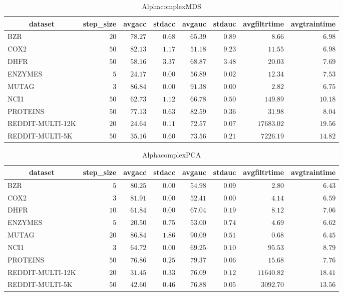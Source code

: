 \begin{table}[!tbp]
\caption{AlphacomplexMDS\label{AlphacomplexMDS}} 
{\centering
\begin{tabular}{lrrrrrrr}
\hline\hline
\multicolumn{1}{c}{dataset}&\multicolumn{1}{c}{step_size}&\multicolumn{1}{c}{avgacc}&\multicolumn{1}{c}{stdacc}&\multicolumn{1}{c}{avgauc}&\multicolumn{1}{c}{stdauc}&\multicolumn{1}{c}{avgfiltrtime}&\multicolumn{1}{c}{avgtraintime}\tabularnewline
\hline
BZR&$20$&$78.27$&$0.68$&$65.39$&$0.89$&$    8.66$&$ 6.98$\tabularnewline
COX2&$50$&$82.13$&$1.17$&$51.18$&$9.23$&$   11.55$&$ 6.98$\tabularnewline
DHFR&$50$&$58.16$&$3.37$&$68.87$&$3.48$&$   20.03$&$ 7.69$\tabularnewline
ENZYMES&$ 5$&$24.17$&$0.00$&$56.89$&$0.02$&$   12.34$&$ 7.53$\tabularnewline
MUTAG&$ 3$&$86.84$&$0.00$&$91.38$&$0.00$&$    2.82$&$ 6.75$\tabularnewline
NCI1&$50$&$62.73$&$1.12$&$66.78$&$0.50$&$  149.89$&$10.18$\tabularnewline
PROTEINS&$50$&$77.13$&$0.63$&$82.59$&$0.36$&$   31.98$&$ 8.04$\tabularnewline
REDDIT-MULTI-12K&$20$&$24.64$&$0.11$&$72.57$&$0.07$&$17683.02$&$19.56$\tabularnewline
REDDIT-MULTI-5K&$50$&$35.16$&$0.60$&$73.56$&$0.21$&$ 7226.19$&$14.82$\tabularnewline
\hline
\end{tabular}}
\end{table}
\begin{table}[!tbp]
\caption{AlphacomplexPCA\label{AlphacomplexPCA}} 
{\centering
\begin{tabular}{lrrrrrrr}
\hline\hline
\multicolumn{1}{c}{dataset}&\multicolumn{1}{c}{step_size}&\multicolumn{1}{c}{avgacc}&\multicolumn{1}{c}{stdacc}&\multicolumn{1}{c}{avgauc}&\multicolumn{1}{c}{stdauc}&\multicolumn{1}{c}{avgfiltrtime}&\multicolumn{1}{c}{avgtraintime}\tabularnewline
\hline
BZR&$ 5$&$80.25$&$0.00$&$54.98$&$0.09$&$    2.80$&$ 6.43$\tabularnewline
COX2&$ 3$&$81.91$&$0.00$&$52.41$&$0.00$&$    4.14$&$ 6.59$\tabularnewline
DHFR&$10$&$61.84$&$0.00$&$67.04$&$0.19$&$    8.12$&$ 7.06$\tabularnewline
ENZYMES&$ 5$&$20.50$&$0.75$&$53.00$&$0.74$&$    4.69$&$ 6.62$\tabularnewline
MUTAG&$20$&$86.84$&$1.86$&$90.09$&$0.51$&$    0.68$&$ 6.45$\tabularnewline
NCI1&$ 3$&$64.72$&$0.00$&$69.25$&$0.10$&$   95.53$&$ 8.79$\tabularnewline
PROTEINS&$50$&$76.86$&$0.25$&$79.37$&$0.06$&$   15.68$&$ 7.76$\tabularnewline
REDDIT-MULTI-12K&$20$&$31.45$&$0.33$&$76.09$&$0.12$&$11640.82$&$18.41$\tabularnewline
REDDIT-MULTI-5K&$50$&$42.60$&$0.46$&$76.88$&$0.05$&$ 3092.70$&$13.56$\tabularnewline
\hline
\end{tabular}}
\end{table}
